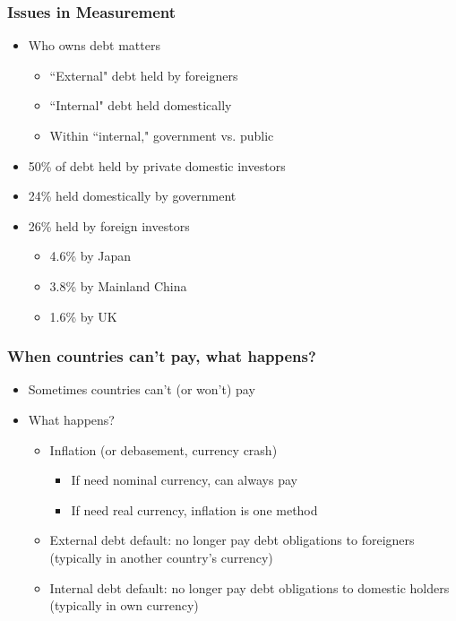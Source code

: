 \documentclass{beamer}
\begin{document}
\begin{frame}
\frametitle{Issues in Measurement}
\begin{itemize}
\item Who owns debt matters
\bigskip
\begin{itemize}
\item ``External" debt held by foreigners
\bigskip
\item ``Internal" debt held domestically
\bigskip
\item Within ``internal," government vs. public
\end{itemize}
\bigskip
\item 50\% of debt held by private domestic investors
\bigskip
\item 24\% held domestically by government
\bigskip
\item 26\% held by foreign investors  
\begin{itemize}
\item 4.6\% by Japan
\bigskip
\item 3.8\% by Mainland China
\bigskip
\item 1.6\% by UK
\end{itemize}
\end{itemize}
\end{frame}

\begin{frame}
\frametitle{When countries can't pay, what happens?}
\begin{itemize}
\item Sometimes countries can't (or won't) pay
\bigskip
\item What happens?
\begin{itemize}
\item Inflation (or debasement, currency crash)
\begin{itemize}
\item If need nominal currency, can always pay
\item If need real currency, inflation is one method
\end{itemize}
\bigskip
\item External debt default: no longer pay debt obligations to foreigners (typically in another country's currency)
\bigskip
\item Internal debt default: no longer pay debt obligations to domestic holders (typically in own currency)
\end{itemize}
\end{itemize}
\end{frame}
\end{document}
